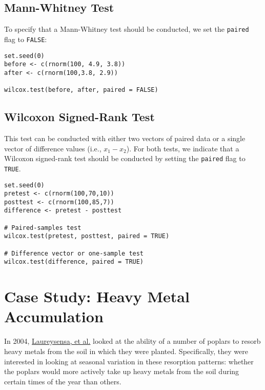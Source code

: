 \subsection{Mann-Whitney Test}

To specify that a Mann-Whitney test should be conducted, we set the \verb|paired| flag to \verb|FALSE|:

\begin{framed}
\begin{Verbatim}[samepage=TRUE]
set.seed(0)
before <- c(rnorm(100, 4.9, 3.8))
after <- c(rnorm(100,3.8, 2.9))

wilcox.test(before, after, paired = FALSE)
\end{Verbatim}
\end{framed}

\subsection{Wilcoxon Signed-Rank Test}

This test can be conducted with either two vectors of paired data or a single vector of difference values (i.e., $x_1-x_2$). For both tests, we indicate that a Wilcoxon signed-rank test should be conducted by setting the \verb|paired| flag to \verb|TRUE|.

\begin{framed}
\begin{Verbatim}[samepage=TRUE]
set.seed(0)
pretest <- c(rnorm(100,70,10))
posttest <- c(rnorm(100,85,7))
difference <- pretest - posttest

# Paired-samples test
wilcox.test(pretest, posttest, paired = TRUE)

# Difference vector or one-sample test
wilcox.test(difference, paired = TRUE)
\end{Verbatim}
\end{framed}

\section{Case Study: Heavy Metal Accumulation}

In 2004, \href{http://www.sciencedirect.com/science/article/pii/S0269749104001058}{Laureysensa, et al.} looked at the ability of a number of poplars to resorb heavy metals from the soil in which they were planted. Specifically, they were interested in looking at seasonal variation in these resorption patterns: whether the poplars would more actively take up heavy metals from the soil during certain times of the year than others.

